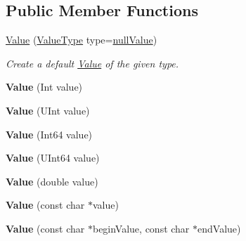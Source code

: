 \subsection*{Public Member Functions}
\begin{DoxyCompactItemize}
\item 
\hyperlink{class_json_1_1_value_ada6ba1369448fb0240bccc36efaa46f7}{Value} (\hyperlink{namespace_json_a7d654b75c16a57007925868e38212b4e}{Value\-Type} type=\hyperlink{namespace_json_a7d654b75c16a57007925868e38212b4ea7d9899633b4409bd3fc107e6737f8391}{null\-Value})
\begin{DoxyCompactList}\small\item\em Create a default \hyperlink{class_json_1_1_value}{Value} of the given type. \end{DoxyCompactList}\item 
\hypertarget{class_json_1_1_value_a4744ae571fcf34f4b16a2257b3b3b585}{{\bfseries Value} (Int value)}\label{class_json_1_1_value_a4744ae571fcf34f4b16a2257b3b3b585}

\item 
\hypertarget{class_json_1_1_value_ae67a857b01286e3499a87e95be848d20}{{\bfseries Value} (U\-Int value)}\label{class_json_1_1_value_ae67a857b01286e3499a87e95be848d20}

\item 
\hypertarget{class_json_1_1_value_ab1cdc3d9a4d4cc03fa01439d43ceb1b5}{{\bfseries Value} (Int64 value)}\label{class_json_1_1_value_ab1cdc3d9a4d4cc03fa01439d43ceb1b5}

\item 
\hypertarget{class_json_1_1_value_a8adda58d5ae17bf7ca6a53bab4a7b69c}{{\bfseries Value} (U\-Int64 value)}\label{class_json_1_1_value_a8adda58d5ae17bf7ca6a53bab4a7b69c}

\item 
\hypertarget{class_json_1_1_value_a32228cc84d83200cca8441451997996c}{{\bfseries Value} (double value)}\label{class_json_1_1_value_a32228cc84d83200cca8441451997996c}

\item 
\hypertarget{class_json_1_1_value_ad87b849356816aca75995dd07302e49d}{{\bfseries Value} (const char $\ast$value)}\label{class_json_1_1_value_ad87b849356816aca75995dd07302e49d}

\item 
\hypertarget{class_json_1_1_value_a13e567d467bb1e699d71e27a76b0e988}{{\bfseries Value} (const char $\ast$begin\-Value, const char $\ast$end\-Value)}\label{class_json_1_1_value_a13e567d467bb1e699d71e27a76b0e988}


\end{DoxyCompactItemize}
